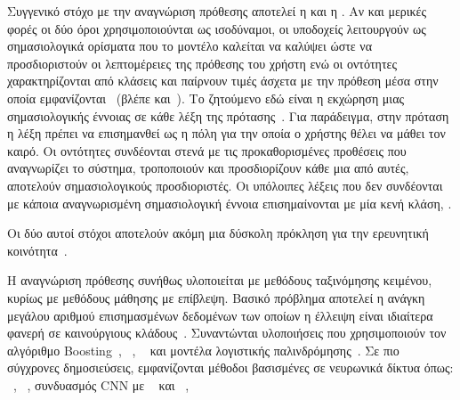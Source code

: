 Συγγενικό στόχο με την αναγνώριση πρόθεσης αποτελεί η  και η .
Αν και μερικές φορές οι δύο όροι χρησιμοποιούνται ως ισοδύναμοι,
οι υποδοχείς λειτουργούν ως σημασιολογικά ορίσματα που το μοντέλο καλείται να καλύψει ώστε να προσδιοριστούν οι λεπτομέρειες της πρόθεσης του χρήστη
ενώ οι οντότητες χαρακτηρίζονται από κλάσεις και παίρνουν τιμές άσχετα με την πρόθεση μέσα στην οποία εμφανίζονται~\cite{mesnil2013investigation,snips} (βλέπε και~).
Το ζητούμενο εδώ είναι η εκχώρηση μιας σημασιολογικής έννοιας σε κάθε λέξη της πρότασης~\cite{vu2016bi}.
Για παράδειγμα, στην πρόταση  η λέξη  πρέπει να επισημανθεί ως η πόλη για την οποία ο χρήστης θέλει να μάθει τον καιρό.
Οι οντότητες συνδέονται στενά με τις προκαθορισμένες προθέσεις που αναγνωρίζει το σύστημα, τροποποιούν και προσδιορίζουν κάθε μια από αυτές, αποτελούν σημασιολογικούς προσδιοριστές.
Οι υπόλοιπες λέξεις που δεν συνδέονται με κάποια αναγνωρισμένη σημασιολογική έννοια επισημαίνονται με μία κενή κλάση, \noslot{}.

Οι δύο αυτοί στόχοι αποτελούν ακόμη μια δύσκολη πρόκληση για την ερευνητική κοινότητα~\cite{tur2011intent,sarikaya2017technology}.

Η αναγνώριση πρόθεσης συνήθως υλοποιείται με μεθόδους ταξινόμησης κειμένου, κυρίως με μεθόδους μάθησης με επίβλεψη.
Βασικό πρόβλημα αποτελεί η ανάγκη μεγάλου αριθμού επισημασμένων δεδομένων των οποίων η έλλειψη είναι ιδιαίτερα φανερή σε καινούργιους κλάδους~\cite{wang2016recent}.
Συναντώνται υλοποιήσεις που χρησιμοποιούν
τον αλγόριθμο Boosting~\cite{schapire2000boostexter},
~\cite{haffner2003optimizing,bhargava2013easy},
~\cite{ang2005automatic} και
μοντέλα λογιστικής παλινδρόμησης~\cite{snips,rasa}.
Σε πιο σύγχρονες δημοσιεύσεις, εμφανίζονται μέθοδοι βασισμένες σε νευρωνικά δίκτυα όπως:
~\cite{sarikaya2014application},
~\cite{kim2014convolutional,zhang2015sensitivity},
συνδυασμός CNN με ~\cite{zhou2015c} και
~\cite{yang2016hierarchical},

